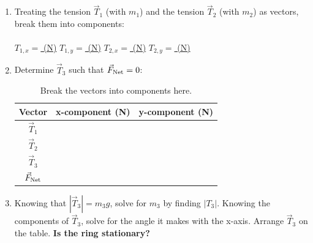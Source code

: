 \documentclass{article}
\begin{document}
\begin{enumerate}
\item Treating the tension $\vec{T}_1$ (with $m_1$) and the tension $\vec{T}_2$ (with $m_2$) as vectors, break them into components:
\\ \\
\underline{$T_{1,x}=$ \hspace{1cm} (N)} \hspace{0.5cm} \underline{$T_{1,y}=$ \hspace{1cm} (N)} \hspace{1cm} \underline{$T_{2,x}=$ \hspace{1cm} (N)} \hspace{0.5cm} \underline{$T_{2,y}=$ \hspace{1cm} (N)}
\item Determine $\vec{T}_3$ such that $\vec{F}_{\rm Net} = 0$:
\begin{table}[hb]
\centering
\begin{tabular}{| c | c | c |}
\hline
Vector & x-component (N) & y-component (N) \\ \hline
$\vec{T}_1$ & & \\ \hline
$\vec{T}_2$ & & \\ \hline
$\vec{T}_3$ & & \\ \hline
$\vec{F}_{\rm Net}$ & & \\ \hline
\end{tabular}
\caption{\label{tab:data} Break the vectors into components here.}
\end{table}
\item Knowing that $|\vec{T}_3| = m_3 g$, solve for $m_3$ by finding $|T_{3}|$.  Knowing the components of $\vec{T}_3$, solve for the angle it makes with the x-axis.  Arrange $\vec{T}_3$ on the table.  \textbf{Is the ring stationary?}
\end{enumerate}
\end{document}
